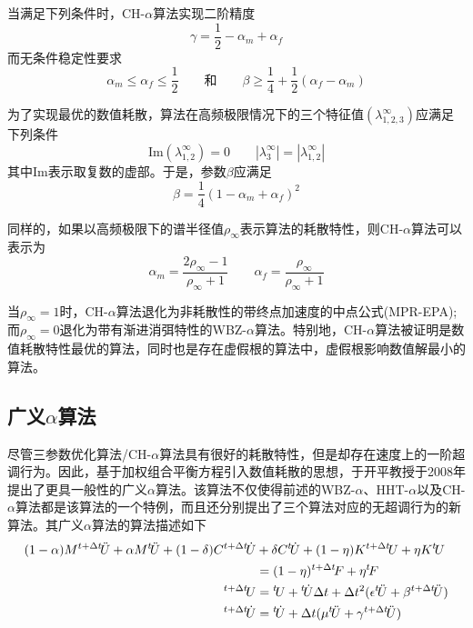 当满足下列条件时，CH-$\alpha$算法实现二阶精度
\begin{equation}
\gamma=\frac{1}{2}-\alpha_m+\alpha_f
\end{equation}
而无条件稳定性要求
\begin{equation}
\alpha_m\le\alpha_f\le\frac{1}{2}\qquad\text{和}\qquad\beta\ge\frac{1}{4}+\frac{1}{2}(\alpha_f-\alpha_m)
\end{equation}

为了实现最优的数值耗散，算法在高频极限情况下的三个特征值$(\lambda_{1,2,3}^{\infty})$应满足下列条件
\begin{equation}
\text{Im} (\lambda_{1,2}^{\infty})=0\qquad|\lambda_{3}^{\infty}|=|\lambda_{1,2}^{\infty}|
\end{equation}
其中Im表示取复数的虚部。于是，参数$\beta$应满足
\begin{equation}
\beta=\frac{1}{4}(1-\alpha_m+\alpha_f)^2
\end{equation}

同样的，如果以高频极限下的谱半径值$\rho_{\infty}$表示算法的耗散特性，则CH-$\alpha$算法可以表示为
\begin{equation}
\alpha_m=\frac{2\rho_{\infty}-1}{\rho_{\infty}+1}\qquad\alpha_f=\frac{\rho_{\infty}}{\rho_{\infty}+1}
\end{equation}

当$\rho_{\infty}=1$时，CH-$\alpha$算法退化为非耗散性的带终点加速度的中点公式(MPR-EPA);而$\rho_{\infty}=0$退化为带有渐进消弭特性的WBZ-$\alpha$算法。特别地，CH-$\alpha$算法被证明是数值耗散特性最优的算法，同时也是存在虚假根的算法中，虚假根影响数值解最小的算法\cite{Hulbert1994}。

\subsection{广义$\alpha$算法}

尽管三参数优化算法/CH-$\alpha$算法具有很好的耗散特性，但是却存在速度上的一阶超调行为。因此，基于加权组合平衡方程引入数值耗散的思想，于开平教授于2008年提出了更具一般性的广义$\alpha$算法\cite{KaiPing2008}。该算法不仅使得前述的WBZ-$\alpha$、HHT-$\alpha$以及CH-$\alpha$算法都是该算法的一个特例，而且还分别提出了三个算法对应的无超调行为的新算法。其广义$\alpha$算法的算法描述如下
\begin{subequations}
\begin{align}
(1-\alpha)M{^{t+\Delta t}\!\ddot{U}}+\alpha M{^{t}\!\ddot{U}}+(1-\delta)C{^{t+\Delta t}\!\dot{U}}&+\delta C{^t\!\dot{U}}+(1-\eta)K{^{t+\Delta t}\!U}+\eta K{^t\!U}\notag\\
&=(1-\eta){^{t+\Delta t}\!F}+\eta {^t\!F}\\
{^{t+\Delta t}\!{U}}&={^t\!U}+{^t\!\dot{U}}\Delta t+\Delta t^2(\epsilon{^t\!\ddot{U}}+\beta{^{t+\Delta t}\!\ddot{U}})\\
{^{t+\Delta t}\!\dot{U}}&={^t\!\dot{U}}+\Delta t(\mu{^t\!\ddot{U}}+\gamma{^{t+\Delta t}\!\ddot{U}})
\end{align}
\end{subequations}

